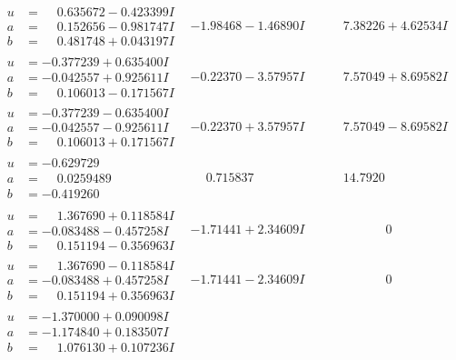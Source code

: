 \documentclass[1p]{elsarticle_modified}
\theoremstyle{definition}
\begin{document}
$$\begin{array}{c|c|c}
\begin{aligned}
u &= \phantom{-}0.635672 - 0.423399 I \\
a &= \phantom{-}0.152656 - 0.981747 I \\
b &= \phantom{-}0.481748 + 0.043197 I\end{aligned}
 & -1.98468 - 1.46890 I & \phantom{-}7.38226 + 4.62534 I \\ \hline\begin{aligned}
u &= -0.377239 + 0.635400 I \\
a &= -0.042557 + 0.925611 I \\
b &= \phantom{-}0.106013 - 0.171567 I\end{aligned}
 & -0.22370 - 3.57957 I & \phantom{-}7.57049 + 8.69582 I \\ \hline\begin{aligned}
u &= -0.377239 - 0.635400 I \\
a &= -0.042557 - 0.925611 I \\
b &= \phantom{-}0.106013 + 0.171567 I\end{aligned}
 & -0.22370 + 3.57957 I & \phantom{-}7.57049 - 8.69582 I \\ \hline\begin{aligned}
u &= -0.629729\phantom{ +0.000000I} \\
a &= \phantom{-}0.0259489\phantom{ +0.000000I} \\
b &= -0.419260\phantom{ +0.000000I}\end{aligned}
 & \phantom{-}0.715837\phantom{ +0.000000I} & \phantom{-}14.7920\phantom{ +0.000000I} \\ \hline\begin{aligned}
u &= \phantom{-}1.367690 + 0.118584 I \\
a &= -0.083488 - 0.457258 I \\
b &= \phantom{-}0.151194 - 0.356963 I\end{aligned}
 & -1.71441 + 2.34609 I & \phantom{-0.000000 } 0 \\ \hline\begin{aligned}
u &= \phantom{-}1.367690 - 0.118584 I \\
a &= -0.083488 + 0.457258 I \\
b &= \phantom{-}0.151194 + 0.356963 I\end{aligned}
 & -1.71441 - 2.34609 I & \phantom{-0.000000 } 0 \\ \hline\begin{aligned}
u &= -1.370000 + 0.090098 I \\
a &= -1.174840 + 0.183507 I \\
b &= \phantom{-}1.076130 + 0.107236 I\end{aligned}

\end{array}$$
\end{document}
